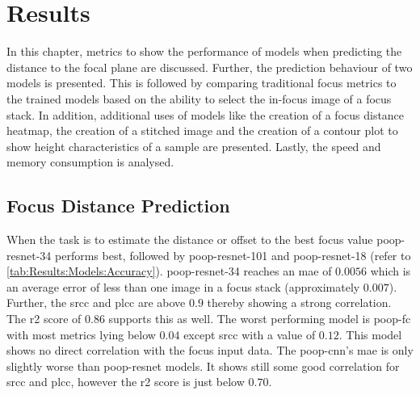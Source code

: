 \chapter{Results}
\label{ch:Results}

In this chapter, metrics to show the performance of models when predicting the distance to the focal plane are discussed. Further, the prediction behaviour of two models is presented. This is followed by comparing traditional focus metrics to the trained models based on the ability to select the in-focus image of a focus stack. In addition, additional uses of models like the creation of a focus distance heatmap, the creation of a stitched image and the creation of a contour plot to show height characteristics of a sample are presented. Lastly, the speed and memory consumption is analysed.



\section{Focus Distance Prediction}
\label{sec:Results:FocusDistance}

When the task is to estimate the distance or offset to the best focus value \acs{poop}-\acs{resnet}-34 performs best, followed by \acs{poop}-\acs{resnet}-101 and \acs{poop}-\acs{resnet}-18 (refer to \autoref{tab:Results:Models:Accuracy}). \Acs{poop}-\acs{resnet}-34 reaches an \ac{mae} of $0.0056$ which is an average error of less than one image in a focus stack (approximately $0.007$). Further, the \ac{srcc} and \ac{plcc} are above $0.9$ thereby showing a strong correlation. The \ac{r2} score of $0.86$ supports this as well.
The worst performing model is \acs{poop}-\acs{fc} with most metrics lying below $0.04$ except \ac{srcc} with a value of $0.12$. This model shows no direct correlation with the focus input data. The \acs{poop}-\acs{cnn}'s \ac{mae} is only slightly worse than \acs{poop}-\acs{resnet} models. It shows still some good correlation for \ac{srcc} and \ac{plcc}, however the \ac{r2} score is just below $0.70$. 

